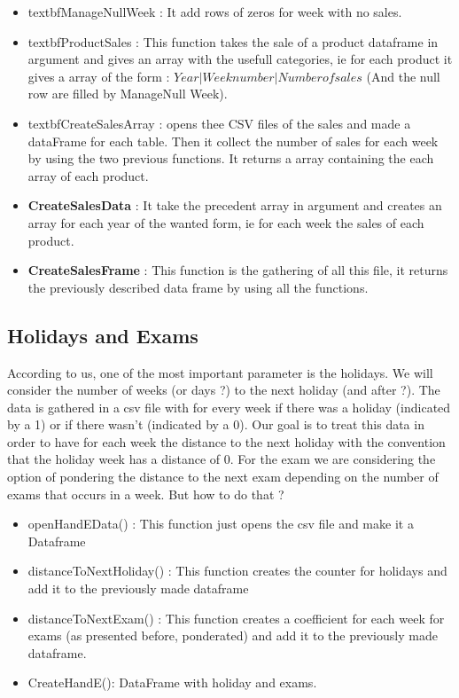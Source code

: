 \documentclass{report}
\begin{document}
\begin{itemize}
\item textbf{ManageNullWeek} : It add rows of zeros for week with no sales.
\item textbf{ProductSales} : This function takes the sale of a product dataframe in argument and gives an array with the usefull categories, ie for each product it gives a array of the form : $Year | Week number  | Number of sales$ (And the null row are filled by ManageNull Week).
\item textbf{CreateSalesArray} : opens thee CSV files of the sales and made a dataFrame for each table. Then it collect the number of sales for each week by using the two previous functions. It returns a array containing the each array of each product.
\item \textbf{CreateSalesData} : It take the precedent array in argument and creates an array for each year of the wanted form, ie for each week the sales of each product.
\item \textbf{CreateSalesFrame} : This function is the gathering of all this file, it returns the previously described data frame by using all the functions.
\end{itemize}

\subsection{Holidays and Exams}

According to us, one of the most important parameter is the holidays. We will consider the number of weeks (or days ?) to the next holiday (and after ?). The data is gathered in a csv file with for every week if there was a holiday (indicated by a 1) or if there wasn't (indicated by a 0). Our goal is to treat this data in order to have for each week the distance to the next holiday with the convention that the holiday week has a distance of 0.
For the exam we are considering the option of pondering the distance to the next exam depending on the number of exams that occurs in a week. But how to do that ?

\begin{itemize}
\item openHandEData() : This function just opens the csv file and make it a Dataframe
\item distanceToNextHoliday() : This function creates the counter for holidays and add it to the previously made dataframe
\item distanceToNextExam() : This function creates a coefficient for each week for exams (as presented before, ponderated) and add it to the previously made dataframe.
\item CreateHandE(): DataFrame with holiday and exams.
\end{itemize}
\end{document}
